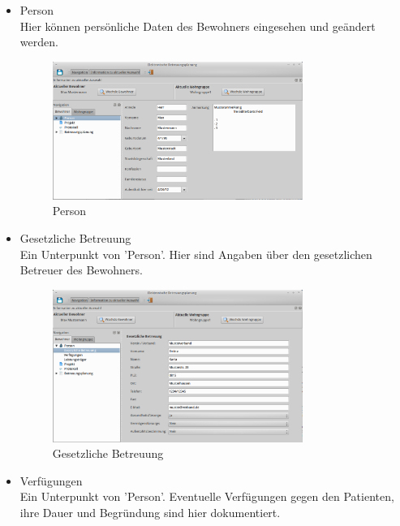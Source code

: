 \begin{itemize}
	\item Person\mbox{}\\
	\noindent
	Hier können persönliche Daten des Bewohners eingesehen und geändert werden.
	\begin{figure}[h]
		\begin{center}
			\includegraphics[keepaspectratio=true, width=0.77\textwidth]{pics/client_person.png}
			\caption{Person}
		\end{center}
	\end{figure}
	\FloatBarrier
	\item Gesetzliche Betreuung\mbox{}\\
	\noindent
	Ein Unterpunkt von 'Person'. Hier sind Angaben über den gesetzlichen Betreuer des Bewohners.
	\begin{figure}[h]
		\begin{center}
			\includegraphics[keepaspectratio=true, width=0.77\textwidth]{pics/client_betreuung.png}
			\caption{Gesetzliche Betreuung}
		\end{center}
	\end{figure}
	\FloatBarrier
	\item Verfügungen\mbox{}\\
	\noindent
	Ein Unterpunkt von 'Person'. Eventuelle Verfügungen gegen den Patienten, ihre Dauer und Begründung sind hier dokumentiert.

\end{itemize}
